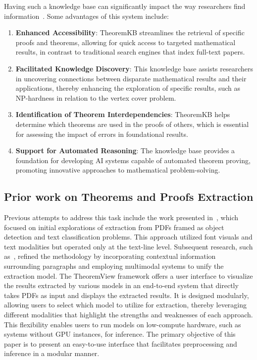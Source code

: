 \documentclass[runningheads]{llncs}
\begin{document}
Having such a knowledge base can significantly impact the way researchers find information~\cite{doceng_paper}. Some advantages of this system include:
\begin{enumerate}
    \item \textbf{Enhanced Accessibility}: TheoremKB streamlines the retrieval of specific proofs and theorems, allowing for quick access to targeted mathematical results, in contrast to traditional search engines that index full-text papers.
    \item \textbf{Facilitated Knowledge Discovery}: This knowledge base assists researchers in uncovering connections between disparate mathematical results and their applications, thereby enhancing the exploration of specific results, such as NP-hardness in relation to the vertex cover problem.
    \item \textbf{Identification of Theorem Interdependencies}: TheoremKB helps determine which theorems are used in the proofs of others, which is essential for assessing the impact of errors in foundational results.
    \item \textbf{Support for Automated Reasoning}: The knowledge base provides a foundation for developing AI systems capable of automated theorem proving, promoting innovative approaches to mathematical problem-solving.
\end{enumerate}

\subsection{Prior work on Theorems and Proofs Extraction}

Previous attempts to address this task include the work presented in~\cite{doceng_paper}, which focused on
initial explorations of extraction from PDFs framed as object detection and text classification problems.
This approach utilized font visuals and text modalities but operated only at the text-line level. Subsequent
research, such as~\cite{mishra2024modularmultimodalmachinelearning}, refined the methodology by incorporating contextual information
surrounding paragraphs and employing multimodal systems to unify the extraction model.
The TheoremView framework offers a user interface to visualize the results extracted by various models in
an end-to-end system that directly takes PDFs as input and displays the extracted results. It is designed
modularly, allowing users to select which model to utilize for extraction, thereby leveraging different
modalities that highlight the strengths and weaknesses of each approach. This flexibility enables users
to run models on low-compute hardware, such as systems without GPU instances, for inference. The primary
objective of this paper is to present an easy-to-use interface that facilitates preprocessing and inference
in a modular manner.
\end{document}
